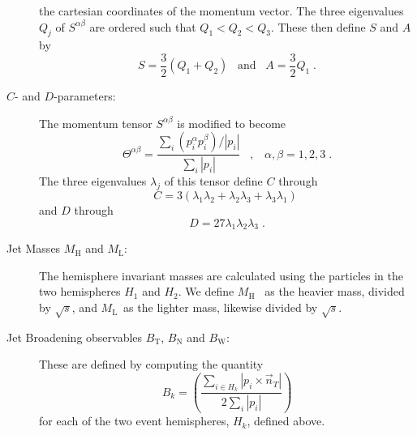 \documentclass[12pt,a4paper,twoside]{article}
\newcommand{\bt}     {\ensuremath{B_{\mathrm{T}}}}
\newcommand{\bw}     {\ensuremath{B_{\mathrm{W}}}}
\newcommand{\bn}     {\ensuremath{B_{\mathrm{N}}}}
\newcommand{\cp}     {\ensuremath{C}}
\newcommand{\mh}     {\ensuremath{M_{\mathrm{H}}}}
\newcommand{\ml}     {\ensuremath{M_{\mathrm{L}}}}
\newcommand{\rs}     {\ensuremath{\sqrt{s}}}
\newcommand{\bm}[1]  {\mbox{\boldmath\ensuremath{#1}}}
\begin{document}
\begin{description}
  the cartesian coordinates of the momentum vector. 
  The three eigenvalues $Q_j$ of $S^{\alpha\beta}$ are ordered such
  that $Q_1<Q_2<Q_3$. These then define $S$ \cite{def_s1,def_s2} and $A$
  \cite{def_a} by
 \begin{equation}
    S= \frac{3}{2}(Q_1+Q_2)\;\;\;\mathrm{and}\;\;\; A= \frac{3}{2}Q_1\;.
  \end{equation}
\item[\bm{C}- and \bm{D}-parameters:]
  The momentum tensor $S^{\alpha\beta}$ is modified to become
  \begin{equation}
    \Theta^{\alpha\beta}= \frac{\sum_i(p_i^{\alpha}p_i^{\beta})/|p_i|}
                               {\sum_i|p_i|}\;\;\;,
                           \;\;\;\alpha,\beta= 1,2,3\;.
  \end{equation}
  The three eigenvalues $\lambda_j$ of this tensor define \cp
  \cite{def_c} through
 \begin{equation}
    \cp= 3(\lambda_1\lambda_2+\lambda_2\lambda_3+\lambda_3\lambda_1)\;
  \end{equation}
and $D$ through
\begin{equation}D=27\lambda_1\lambda_2\lambda_3 \;.\end{equation}
\item[Jet Masses \bm{\mh} and \bm{\ml}:] The hemisphere 
invariant masses are calculated using  the particles
  in the two hemispheres $H_1$ and $H_2$.   We define
  \mh\ \cite{def_mh1,def_mh2} as the heavier mass, divided by $\rs$,
and  \ml\ as the lighter mass, likewise divided by $\rs$.
\item[Jet Broadening observables \bm{\bt}, \bm{\bn} and \bm{\bw}:] 
  These are defined by computing the quantity
  \begin{equation}
    B_k= \left(\frac{\sum_{i\in H_k}|p_i\times\vec{n}_T|}
                    {2\sum_i|p_i|}\right)
  \label{equ_btbw}
  \end{equation}
  for each of the two event hemispheres, $H_k$,  defined above.

\end{description}
\end{document}
